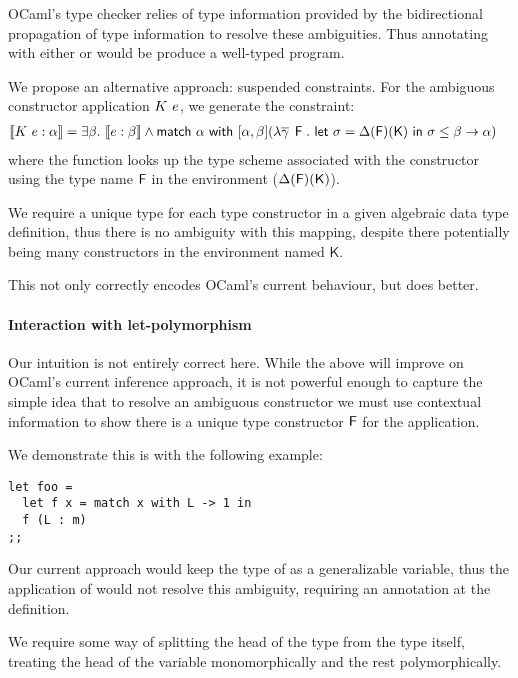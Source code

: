 \documentclass[acmsmall,screen,nonacm]{acmart}
\begin{document}
OCaml's type checker relies of type information provided by the
bidirectional propagation of type information to resolve these
ambiguities. Thus annotating  with either  or  would
be produce a well-typed program.

We propose an alternative approach: suspended constraints. For the ambiguous
constructor application $K ~ e$, we generate the constraint:
\begin{align*}
\llbracket K ~ e : \alpha \rrbracket &= \exists {\beta}. ~ \llbracket e : \beta \rrbracket \wedge \mathsf{match} ~ \alpha ~ \mathsf{with} ~ [ \alpha, \beta ] (\lambda \overline{\gamma} \mathop{}\mathrel{\mathsf{F}}. ~ \mathsf{let} ~ \sigma = \Delta(\mathsf{F})(\mathsf{K}) ~ \mathsf{in} ~ \sigma \leq \beta \to \alpha )
\end{align*}
where the function looks up the type scheme associated with the constructor
using the type name $\mathsf{F}$ in the environment ($\Delta(\mathsf{F})(\mathsf{K})$).

We require a unique type for each type constructor in a given algebraic data
type definition, thus there is no ambiguity with this mapping, despite there
potentially being many constructors in the environment named $\mathsf{K}$.

This not only correctly encodes OCaml's current behaviour, but does better.


\paragraph{Interaction with let-polymorphism}

Our intuition is not entirely correct here. While the above will improve on
OCaml's current inference approach, it is not powerful enough to capture the
simple idea that to resolve an ambiguous constructor we must use contextual
information to show there is a unique type constructor $\mathsf{F}$ for the
application.

We demonstrate this is with the following example:
\begin{lstlisting}
let foo =
  let f x = match x with L -> 1 in
  f (L : m)
;;
\end{lstlisting}
Our current approach would keep the type of  as a generalizable
variable, thus the application of  would not resolve this ambiguity,
requiring an annotation at the definition.

We require some way of splitting the head of the type from the type itself,
treating the head of the variable monomorphically and the rest
polymorphically.
\end{document}
